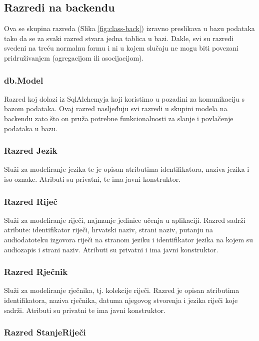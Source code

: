 \subsection{Razredi na backendu}

Ova se skupina razreda (Slika \ref{fig:class-back}) izravno preslikava u bazu podataka tako da se za svaki razred stvara jedna tablica u bazi. Dakle, svi su razredi svedeni na treću normalnu formu i ni u kojem slučaju ne mogu biti povezani pridruživanjem (agregacijom ili asocijacijom).

\subsubsection{db.Model}

Razred koj dolazi iz SqlAlchemyja koji koristimo u pozadini za komunikaciju s 
bazom podataka. Ovaj razred nasljeđuju svi razredi u skupini modela na backendu zato što on
pruža potrebne funkcionalnosti za slanje i povlačenje podataka u bazu.


\subsubsection{Razred Jezik}

Služi za modeliranje jezika te je opisan atributima identifikatora,
naziva jezika i iso oznake. Atributi su privatni, te ima javni konstruktor.

\subsubsection{Razred Riječ}

Služi za modeliranje riječi, najmanje jedinice učenja u aplikaciji.
Razred sadrži atribute: identifikator riječi, hrvatski naziv, strani naziv,
putanju na audiodatoteku izgovora riječi na stranom jeziku i identifikator jezika
na kojem su audiozapis i strani naziv. Atributi su privatni i ima javni konstruktor.

\subsubsection{Razred Rječnik}

Služi za modeliranje rječnika, tj. kolekcije riječi. Razred je opisan atributima identifikatora, naziva rječnika, datuma njegovog stvorenja i jezika riječi koje sadrži. Atributi su privatni te ima javni konstruktor.

\subsubsection{Razred StanjeRiječi}

